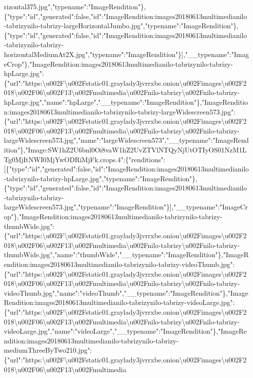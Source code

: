 rizontal375.jpg","typename":"ImageRendition"\},\{"type":"id","generated":false,"id":"ImageRendition:images20180613multimedianilo-tabrizynilo-tabrizy-largeHorizontalJumbo.jpg","typename":"ImageRendition"\},\{"type":"id","generated":false,"id":"ImageRendition:images20180613multimedianilo-tabrizynilo-tabrizy-horizontalMediumAt2X.jpg","typename":"ImageRendition"\}{]},"\_\_typename":"ImageCrop"\},"ImageRendition:images20180613multimedianilo-tabrizynilo-tabrizy-hpLarge.jpg":\{"url":"https:\textbackslash{}u002F\textbackslash{}u002Fstatic01.graylady3jvrrxbe.onion\textbackslash{}u002Fimages\textbackslash{}u002F2018\textbackslash{}u002F06\textbackslash{}u002F13\textbackslash{}u002Fmultimedia\textbackslash{}u002Fnilo-tabrizy\textbackslash{}u002Fnilo-tabrizy-hpLarge.jpg","name":"hpLarge","\_\_typename":"ImageRendition"\},"ImageRendition:images20180613multimedianilo-tabrizynilo-tabrizy-largeWidescreen573.jpg":\{"url":"https:\textbackslash{}u002F\textbackslash{}u002Fstatic01.graylady3jvrrxbe.onion\textbackslash{}u002Fimages\textbackslash{}u002F2018\textbackslash{}u002F06\textbackslash{}u002F13\textbackslash{}u002Fmultimedia\textbackslash{}u002Fnilo-tabrizy\textbackslash{}u002Fnilo-tabrizy-largeWidescreen573.jpg","name":"largeWidescreen573","\_\_typename":"ImageRendition"\},"Image:SW1hZ2U6bnl0Oi8vaW1hZ2UvZTVlNTQyNjUtOTIyOS01NzM1LTg0MjItNWI0MjYwODRiMjFk.crops.4":\{"renditions":{[}\{"type":"id","generated":false,"id":"ImageRendition:images20180613multimedianilo-tabrizynilo-tabrizy-hpLarge.jpg","typename":"ImageRendition"\},\{"type":"id","generated":false,"id":"ImageRendition:images20180613multimedianilo-tabrizynilo-tabrizy-largeWidescreen573.jpg","typename":"ImageRendition"\}{]},"\_\_typename":"ImageCrop"\},"ImageRendition:images20180613multimedianilo-tabrizynilo-tabrizy-thumbWide.jpg":\{"url":"https:\textbackslash{}u002F\textbackslash{}u002Fstatic01.graylady3jvrrxbe.onion\textbackslash{}u002Fimages\textbackslash{}u002F2018\textbackslash{}u002F06\textbackslash{}u002F13\textbackslash{}u002Fmultimedia\textbackslash{}u002Fnilo-tabrizy\textbackslash{}u002Fnilo-tabrizy-thumbWide.jpg","name":"thumbWide","\_\_typename":"ImageRendition"\},"ImageRendition:images20180613multimedianilo-tabrizynilo-tabrizy-videoThumb.jpg":\{"url":"https:\textbackslash{}u002F\textbackslash{}u002Fstatic01.graylady3jvrrxbe.onion\textbackslash{}u002Fimages\textbackslash{}u002F2018\textbackslash{}u002F06\textbackslash{}u002F13\textbackslash{}u002Fmultimedia\textbackslash{}u002Fnilo-tabrizy\textbackslash{}u002Fnilo-tabrizy-videoThumb.jpg","name":"videoThumb","\_\_typename":"ImageRendition"\},"ImageRendition:images20180613multimedianilo-tabrizynilo-tabrizy-videoLarge.jpg":\{"url":"https:\textbackslash{}u002F\textbackslash{}u002Fstatic01.graylady3jvrrxbe.onion\textbackslash{}u002Fimages\textbackslash{}u002F2018\textbackslash{}u002F06\textbackslash{}u002F13\textbackslash{}u002Fmultimedia\textbackslash{}u002Fnilo-tabrizy\textbackslash{}u002Fnilo-tabrizy-videoLarge.jpg","name":"videoLarge","\_\_typename":"ImageRendition"\},"ImageRendition:images20180613multimedianilo-tabrizynilo-tabrizy-mediumThreeByTwo210.jpg":\{"url":"https:\textbackslash{}u002F\textbackslash{}u002Fstatic01.graylady3jvrrxbe.onion\textbackslash{}u002Fimages\textbackslash{}u002F2018\textbackslash{}u002F06\textbackslash{}u002F13\textbackslash{}u002Fmultimedia\textba